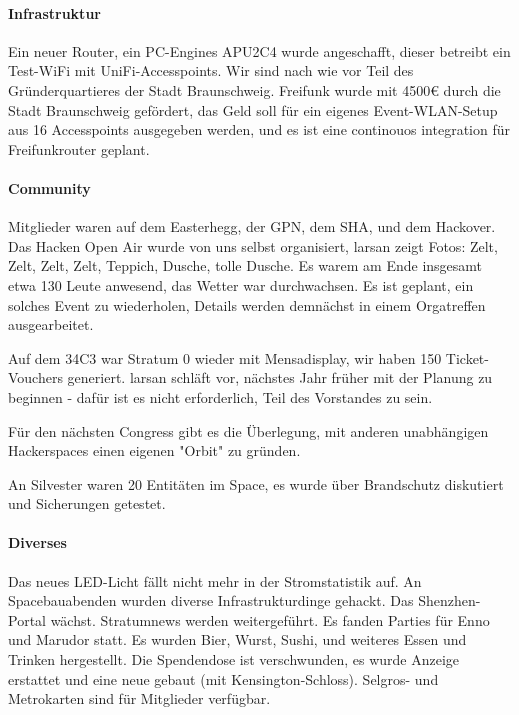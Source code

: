 \documentclass{s0minutes}
\begin{document}
\paragraph{Infrastruktur}

Ein neuer Router, ein PC-Engines APU2C4 wurde angeschafft, dieser betreibt ein Test-WiFi mit UniFi-Accesspoints.
Wir sind nach wie vor Teil des Gründerquartieres der Stadt Braunschweig.
Freifunk wurde mit 4500€ durch die Stadt Braunschweig gefördert, das Geld soll für ein eigenes Event-WLAN-Setup aus 16 Accesspoints ausgegeben werden, und es ist eine continouos integration für Freifunkrouter geplant.

\paragraph{Community}

Mitglieder waren auf dem Easterhegg, der GPN, dem SHA, und dem Hackover. Das Hacken Open Air wurde von uns selbst organisiert, larsan zeigt Fotos: Zelt, Zelt, Zelt, Zelt, Teppich, Dusche, tolle Dusche. Es warem am Ende insgesamt etwa 130 Leute anwesend, das Wetter war durchwachsen. Es ist geplant, ein solches Event zu wiederholen, Details werden demnächst in einem Orgatreffen ausgearbeitet.

Auf dem 34C3 war Stratum 0 wieder mit Mensadisplay, wir haben 150 Ticket-Vouchers generiert. larsan schläft vor, nächstes Jahr früher mit der Planung zu beginnen - dafür ist es nicht erforderlich, Teil des Vorstandes zu sein.

Für den nächsten Congress gibt es die Überlegung, mit anderen unabhängigen Hackerspaces einen eigenen "Orbit" zu gründen.

An Silvester waren 20 Entitäten im Space, es wurde über Brandschutz diskutiert und Sicherungen getestet.

\paragraph{Diverses}

Das neues LED-Licht fällt nicht mehr in der Stromstatistik auf.
An Spacebauabenden wurden diverse Infrastrukturdinge gehackt.
Das Shenzhen-Portal wächst.
Stratumnews werden weitergeführt.
Es fanden Parties für Enno und Marudor statt.
Es wurden Bier, Wurst, Sushi, und weiteres Essen und Trinken hergestellt.
Die Spendendose ist verschwunden, es wurde Anzeige erstattet und eine neue gebaut (mit Kensington-Schloss).
Selgros- und Metrokarten sind für Mitglieder verfügbar.
\end{document}
